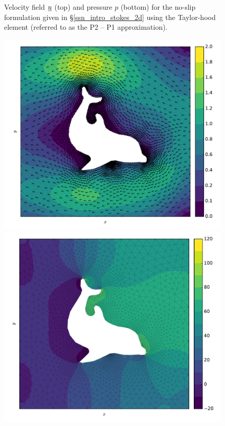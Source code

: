 \begin{figure}
\begin{minipage}[b]{0.60\linewidth}
  \end{minipage}
  \caption[Two-dimensional-no-slip Stokes example]{Velocity field $\underline{u}$ (top) and pressure $p$ (bottom) for the no-slip formulation given in \S \ref{ssn_intro_stokes_2d} using the Taylor-hood element (referred to as the P2 -- P1 approximation).}
  \label{intro_stokes_2d}
\end{figure}

\begin{figure}
  \centering
  \begin{minipage}[b]{0.60\linewidth}
    \includegraphics[width=\linewidth]{images/fenics_intro/2Dstokes_nitsche_u.pdf}
  \end{minipage}
  \quad
  \begin{minipage}[b]{0.60\linewidth}
    \includegraphics[width=\linewidth]{images/fenics_intro/2Dstokes_nitsche_p.pdf}

\end{minipage}
\end{figure}
